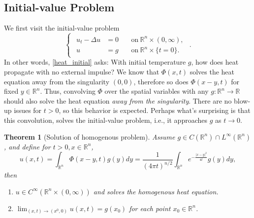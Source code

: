 \documentclass[openany, amssymb, psamsfonts]{amsart}
\newtheorem{thm}{Theorem}[section]
\theoremstyle{definition}
\numberwithin{equation}{section}
\newcommand{\bbr}{\mathbb{R}}
\begin{document}
\subsection{Initial-value Problem} \label{sss_heat_initial_value}
We first visit the initial-value problem \begin{equation} \label{heat_initial}
    \begin{cases}
        \begin{aligned}
            u_t - \Delta u &= 0 && \:\text{on}\: \bbr^n \times (0, \infty) ,\\
            u &= g && \:\text{on}\: \bbr^n \times \{t = 0\} .
        \end{aligned}
    \end{cases}.
\end{equation}
In other words, \eqref{heat_initial} asks: With initial temperature $g$, how does heat propagate with no external impulse? We know that $\Phi(x, t)$ solves the heat equation away from the singularity $(0, 0)$, therefore so does $\Phi(x - y, t)$ for fixed $y \in \bbr^n$. Thus, convolving $\Phi$ over the spatial variables with any $g: \bbr^n \to \bbr$ should also solve the heat equation \textit{away from the singularity}. There are no blow-up issues for $t>0$, so this behavior is expected. Perhaps what's surprising is that this convolution, solves the initial-value problem, i.e., it approaches $g$ as $t \to 0$.

\begin{thm} [Solution of homogenous problem]
    Assume $g \in C(\bbr^n) \cap L^\infty (\bbr^n)$, and define for $t>0, x \in \bbr^n$, \begin{equation} \label{heat_initial_sln}
        u(x, t) = \int_{\bbr^n}\Phi(x-y, t) g(y) dy = \frac{1}{(4 \pi t)^{n/2}} \int_{\bbr^n} e^{-\frac{|x-y|^2}{4t}} g(y) dy,
    \end{equation} then \begin{enumerate}
        \item $u \in C^{\infty} (\bbr^n \times (0, \infty))$ and solves the homogenous heat equation.
        \item $\lim_{(x, t) \to (x^0, 0)} u(x, t) = g(x_0)$ for each point $x_0 \in \bbr^n$.
    \end{enumerate}
\end{thm}
\end{document}
